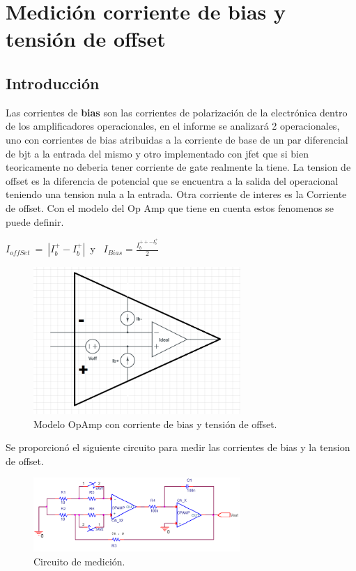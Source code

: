\documentclass[a4paper]{article}
\begin{document}
\section{Medici\'on corriente de bias y tensi\'on de offset}

\subsection{Introducción}
Las corrientes de \textbf{bias} son las corrientes de polarización de la electrónica dentro de los amplificadores operacionales, en el informe se analizará 2 operacionales, uno con corrientes de bias atribuidas a la corriente de base de un par diferencial de bjt a la entrada del mismo y otro implementado con jfet que si bien teoricamente no deberia tener corriente de gate realmente la tiene.
La tension de offset es la diferencia de potencial que se encuentra a la salida del operacional teniendo una tension nula a la entrada.
Otra corriente de interes es la Corriente de offset.
Con el modelo del Op Amp que tiene en cuenta estos fenomenos se puede definir.\newline
 	
 $I_{offSet} \ = \ |I_b^{+}-I_b^{+}|$\ y \ $I_{Bias}= \frac{I_b^{++-I_b^{+}}}{2}$
\begin{figure}[htb]	
	\centering
	\includegraphics[width=0.7\textwidth]{imagenes/opampReal.PNG}
	\caption{Modelo OpAmp con corriente de bias y tensión de offset.}
	\label{fig:OpampBias}
\end{figure}



Se proporcionó el siguiente circuito para medir las corrientes de bias y la tension de offset.

\begin{figure}[htb]	
	\centering
	\includegraphics[width=0.7\textwidth]{imagenes/CircMedicion.PNG}
	\caption{Circuito de medición.}
	\label{fig:CircMedicion}
\end{figure}
\end{document}
